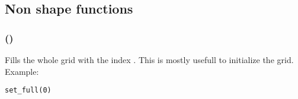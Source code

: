 %
%

\subsection{Non shape functions}

\subsubsection[default\_material]{()}

Fills the whole grid with the index . This is mostly usefull to initialize the grid.\\ Example:
\begin{lstlisting}
set_full(0)
\end{lstlisting}

